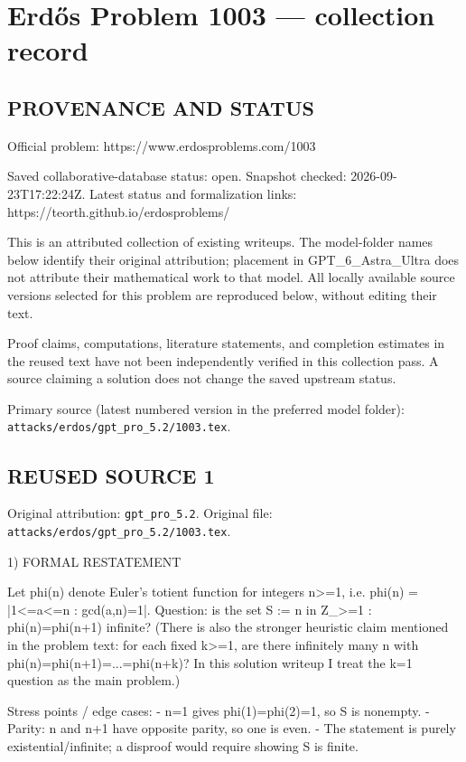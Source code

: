 \section*{Erd\H{o}s Problem 1003 --- collection record}

\subsection*{PROVENANCE AND STATUS}
Official problem: https://www.erdosproblems.com/1003

Saved collaborative-database status: open.
Snapshot checked: 2026-09-23T17:22:24Z.
Latest status and formalization links: https://teorth.github.io/erdosproblems/

This is an attributed collection of existing writeups. The model-folder names below identify their original attribution; placement in GPT\_6\_Astra\_Ultra does not attribute their mathematical work to that model. All locally available source versions selected for this problem are reproduced below, without editing their text.

Proof claims, computations, literature statements, and completion estimates in the reused text have not been independently verified in this collection pass. A source claiming a solution does not change the saved upstream status.

Primary source (latest numbered version in the preferred model folder): \texttt{attacks/erdos/gpt\_pro\_5.2/1003.tex}.

\subsection*{REUSED SOURCE 1}
Original attribution: \texttt{gpt\_pro\_5.2}.
Original file: \texttt{attacks/erdos/gpt\_pro\_5.2/1003.tex}.


1) FORMAL RESTATEMENT

Let phi(n) denote Euler's totient function for integers n>=1, i.e.
phi(n) = |{1<=a<=n : gcd(a,n)=1}|.
Question: is the set
  S := { n in Z_{>=1} : phi(n)=phi(n+1) }
infinite?
(There is also the stronger heuristic claim mentioned in the problem text: for each fixed k>=1, are there infinitely many n with phi(n)=phi(n+1)=...=phi(n+k)? In this solution writeup I treat the k=1 question as the main problem.)

Stress points / edge cases:
- n=1 gives phi(1)=phi(2)=1, so S is nonempty.
- Parity: n and n+1 have opposite parity, so one is even.
- The statement is purely existential/infinite; a disproof would require showing S is finite.

